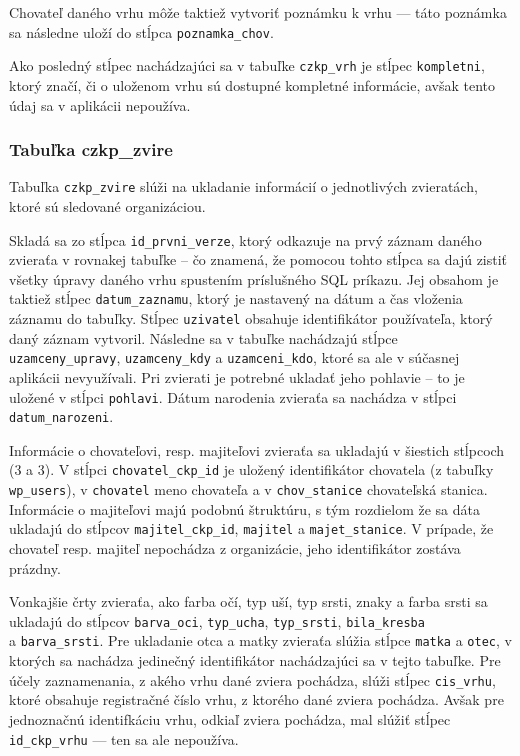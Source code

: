 Chovateľ daného vrhu môže taktiež vytvoriť poznámku k vrhu --- táto poznámka sa následne uloží do stĺpca \texttt{poznamka_chov}.

Ako posledný stĺpec nachádzajúci sa v tabuľke \texttt{czkp_vrh} je stĺpec \texttt{kompletni}, ktorý značí, či o uloženom vrhu sú dostupné kompletné informácie, avšak tento údaj sa v aplikácii nepoužíva.

\subsubsection*{Tabuľka czkp\_zvire}

Tabuľka \texttt{czkp_zvire} slúži na ukladanie informácií o jednotlivých zvieratách, ktoré sú sledované organizáciou.

Skladá sa zo stĺpca \texttt{id_prvni_verze}, ktorý odkazuje na prvý záznam daného zvieraťa v rovnakej tabuľke -- čo znamená, že pomocou tohto stĺpca sa dajú zistiť všetky úpravy daného vrhu spustením príslušného SQL príkazu.
Jej obsahom je taktiež stĺpec \texttt{datum_zaznamu}, ktorý je nastavený na dátum a čas vloženia záznamu do tabuľky. Stĺpec \texttt{uzivatel} obsahuje identifikátor používateľa, ktorý daný záznam vytvoril. Následne sa v tabuľke nachádzajú stĺpce \texttt{uzamceny_upravy}, \texttt{uzamceny_kdy} a \texttt{uzamceni_kdo}, ktoré sa ale v súčasnej aplikácii nevyužívali. Pri zvierati je potrebné ukladať jeho pohlavie -- to je uložené v stĺpci \texttt{pohlavi}. Dátum narodenia zvieraťa sa nachádza v stĺpci \texttt{datum_narozeni}.

Informácie o chovateľovi, resp. majiteľovi zvieraťa sa ukladajú v šiestich stĺpcoch (3 a 3). V stĺpci \texttt{chovatel_ckp_id} je uložený identifikátor chovatela (z tabuľky \texttt{wp_users}), v \texttt{chovatel} meno chovateľa a v \texttt{chov_stanice} chovateľská stanica. Informácie o majiteľovi majú podobnú štruktúru, s tým rozdielom že sa dáta ukladajú do stĺpcov \texttt{majitel_ckp_id}, \texttt{majitel} a \texttt{majet_stanice}. V prípade, že chovateľ resp. majiteľ nepochádza z organizácie, jeho identifikátor zostáva prázdny.

Vonkajšie črty zvieraťa, ako farba očí, typ uší, typ srsti, znaky a farba srsti sa ukladajú do stĺpcov \texttt{barva_oci}, \texttt{typ_ucha}, \texttt{typ_srsti}, \texttt{bila_kresba} \\ a \texttt{barva_srsti}.
Pre ukladanie otca a matky zvieraťa slúžia stĺpce \texttt{matka} a \texttt{otec}, v ktorých sa nachádza jedinečný identifikátor nachádzajúci sa v tejto tabuľke. Pre účely zaznamenania, z akého vrhu dané zviera pochádza, slúži stĺpec \texttt{cis_vrhu}, ktoré obsahuje registračné číslo vrhu, z ktorého dané zviera pochádza. Avšak pre jednoznačnú identifkáciu vrhu, odkiaľ zviera pochádza, mal slúžiť stĺpec \texttt{id_ckp_vrhu} --- ten sa ale nepoužíva.

